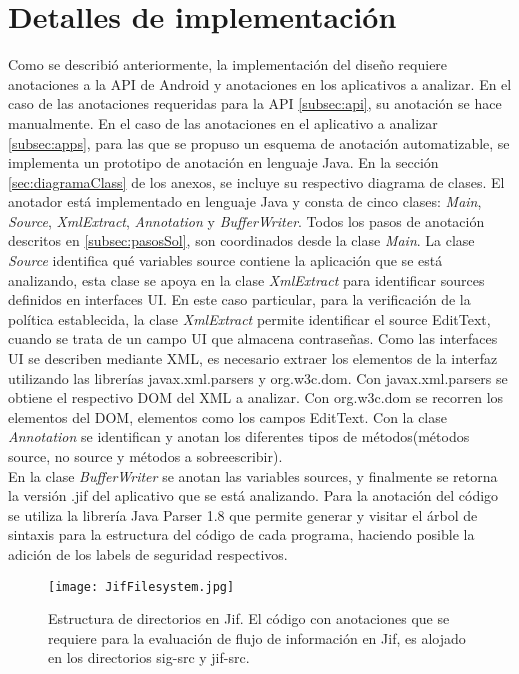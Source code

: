 \section{Detalles de implementación}
Como se describió anteriormente, la implementación del diseño requiere
anotaciones a la API de Android y anotaciones en los aplicativos a
analizar.\newline 
En el caso de las anotaciones requeridas para la API \ref{subsec:api},
su anotación se hace manualmente.\newline 
En el caso de las anotaciones en el
aplicativo a analizar \ref{subsec:apps}, para las que se propuso un esquema de anotación automatizable, se implementa un
prototipo de anotación en lenguaje Java. En la sección \ref{sec:diagramaClass}
de los anexos, se incluye su respectivo diagrama de clases.\newline 
El anotador está implementado en lenguaje Java y consta de cinco clases:
\emph{Main}, \emph{Source}, \emph{XmlExtract}, \emph{Annotation} y
\emph{BufferWriter}.\newline 
Todos los pasos de anotación descritos en
\ref{subsec:pasosSol}, son coordinados desde la clase \emph{Main}.\newline
La clase \emph{Source} identifica qué variables source contiene la aplicación que se
está analizando, esta clase se apoya en la clase \emph{XmlExtract} para identificar
sources definidos en interfaces UI. En este caso particular, para la
verificación de la política establecida, la clase \emph{XmlExtract} permite identificar
el source EditText, cuando se trata de un campo UI que almacena
contraseñas.\newline 
Como las interfaces UI se describen mediante XML, es
necesario extraer los elementos de la interfaz utilizando las librerías javax.xml.parsers y
org.w3c.dom. Con javax.xml.parsers se obtiene el respectivo DOM del XML a
analizar. Con org.w3c.dom se recorren los elementos del DOM, elementos como los
campos EditText.\newline 
Con la clase \emph{Annotation}  se identifican y anotan los diferentes tipos de
métodos(métodos source, no source y métodos a sobreescribir).\\
En la clase \emph{BufferWriter} se anotan las variables sources, y finalmente
se retorna la versión .jif del aplicativo que se está analizando.\newline 
Para la anotación del código se utiliza la librería Java Parser 1.8  que permite
generar y visitar el árbol de sintaxis para la estructura del código de cada
programa, haciendo posible la adición de los labels de seguridad respectivos.\\
\label{subsec:anotador}
\begin{figure}[t!]
	\begin{center}
	\texttt{[image: JifFilesystem.jpg]}
	\end{center}
	\caption{Estructura de directorios en Jif.
	El código con anotaciones que se requiere para la evaluación de flujo de
	información en Jif, es alojado en los directorios sig-src y jif-src.}
	\label{fig:jifFilesystem} 
\end{figure}

